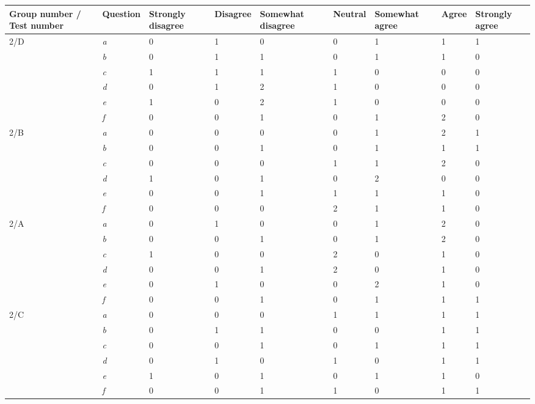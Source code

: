 \begin{center}\small \label{Test2}
	\begin{tabular}{ p{1.4cm} | p{1.4cm} | p{1.3cm} | p{1.4cm} | p{1.7cm} | p{1.2cm} | p{1.7cm} | p{0.9cm}| p{1.3cm} |}
\hline
\textbf{Group number / Test 	number} &\textbf{Question}	&	\textbf{Strongly disagree}	&	\textbf{Disagree}	&	\textbf{Somewhat disagree}	&	\textbf{Neutral}	&	\textbf{Somewhat agree}	&	\textbf{Agree}	&	\textbf{Strongly agree} \\ \hline
2/D		&	\textit{a}	&	0	&	1	&	0	&	0	&	1	&	1	&	1	\\ \hline
		&	\textit{b}	&	0	&	1	&	1	&	0	&	1	&	1	&	0	\\ \hline
		&	\textit{c}	&	1	&	1	&	1	&	1	&	0	&	0	&	0	\\ \hline
		&	\textit{d}	&	0	&	1	&	2	&	1	&	0	&	0	&	0	\\ \hline
		&	\textit{e}	&	1	&	0	&	2	&	1	&	0	&	0	&	0	\\ \hline
		&	\textit{f}	&	0	&	0	&	1	&	0	&	1	&	2	&	0	\\ \hline
2/B		&	\textit{a}	&	0	&	0	&	0	&	0	&	1	&	2	&	1	\\ \hline
		&	\textit{b}	&	0	&	0	&	1	&	0	&	1	&	1	&	1	\\ \hline
		&	\textit{c}	&	0	&	0	&	0	&	1	&	1	&	2	&	0	\\ \hline
		&	\textit{d}	&	1	&	0	&	1	&	0	&	2	&	0	&	0	\\ \hline
		&	\textit{e}	&	0	&	0	&	1	&	1	&	1	&	1	&	0	\\ \hline
		&	\textit{f}	&	0	&	0	&	0	&	2	&	1	&	1	&	0	\\ \hline
2/A		&	\textit{a}	&	0	&	1	&	0	&	0	&	1	&	2	&	0	\\ \hline
		&	\textit{b}	&	0	&	0	&	1	&	0	&	1	&	2	&	0	\\ \hline
		&	\textit{c}	&	1	&	0	&	0	&	2	&	0	&	1	&	0	\\ \hline
		&	\textit{d}	&	0	&	0	&	1	&	2	&	0	&	1	&	0	\\ \hline
		&	\textit{e}	&	0	&	1	&	0	&	0	&	2	&	1	&	0	\\ \hline
		&	\textit{f}	&	0	&	0	&	1	&	0	&	1	&	1	&	1	\\ \hline
2/C		&	\textit{a}	&	0	&	0	&	0	&	1	&	1	&	1	&	1	\\ \hline
		&	\textit{b}	&	0	&	1	&	1	&	0	&	0	&	1	&	1	\\ \hline
		&	\textit{c}	&	0	&	0	&	1	&	0	&	1	&	1	&	1	\\ \hline
		&	\textit{d}	&	0	&	1	&	0	&	1	&	0	&	1	&	1	\\ \hline
		&	\textit{e}	&	1	&	0	&	1	&	0	&	1	&	1	&	0	\\ \hline
		&	\textit{f}	&	0	&	0	&	1	&	1	&	0	&	1	&	1	\\ \hline
	\end{tabular}
\end{center}

